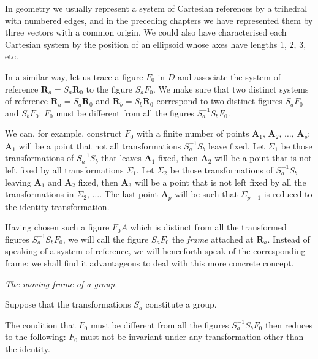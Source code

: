 \documentclass[leqno,11pt]{book}
\numberwithin{equation}{chapter}
\theoremstyle{shape1}
\theoremstyle{shapesmall}
\newcommand{\somespace}{\vspace{9pt}}
\begin{document}
In geometry we usually represent a system of Cartesian references by a trihedral with numbered edges, and in the preceding chapters we have represented them by three vectors with a common origin. We could also have characterised each Cartesian system by the position of an ellipsoid whose axes have lengths $1$, $2$, $3$, etc.

In a similar way, let us trace a figure ${F}_{0}$ in $D$ and associate the system of reference $\mathbf{R}_{a}=S_{a}\mathbf{R}_{0}$ to the figure $S_{a}F_{0}$. We make sure that two distinct systems of reference $\mathbf{R}_{a}=S_{a}\mathbf{R}_{0}$ and $\mathbf{R}_{b}=S_{b}\mathbf{R}_{0}$ correspond to two distinct figures $S_{a}F_{0}$ and $S_{b}F_{0}$: $F_{0}$ must be different from all the figures $S_{a}^{-1}S_{b}F_{0}$.

We can, for example, construct $F_{0}$ with a finite number of points $\mathbf{A}_{1}$, $\mathbf{A}_{2}$, $\dots$, $\mathbf{A}_{p}$: $\mathbf{A}_{1}$ will be a point that not all transformations $S_{a}^{-1}S_{b}$ leave fixed. Let $\Sigma_{1}$ be those transformations of $S_{a}^{-1}S_{b}$ that leaves $\mathbf{A}_{1}$ fixed, then $\mathbf{A}_{2}$ will be a point that is not left fixed by all transformations $\Sigma_{1}$. Let $\Sigma_{2}$ be those transformations of $S_{a}^{-1}S_{b}$ leaving $\mathbf{A}_{1}$ and $\mathbf{A}_{2}$ fixed, then $\mathbf{A}_{3}$ will be a point that is not left fixed by all the transformations in $\Sigma_{2}$, $\dots$. The last point $\mathbf{A}_{p}$ will be such that $\Sigma_{p+1}$ is reduced to the identity transformation.

Having chosen such a figure $F_{0}A$ which is distinct from all the transformed figures $S_{a}^{-1}S_{b}F_{0}$, we will call the figure $S_{a}F_{0}$ the \emph{frame} attached at $\mathbf{R}_{a}$. Instead of speaking of a system of reference, we will henceforth speak of the corresponding frame: we shall find it advantageous to deal with this more concrete concept.

\somespace

\emph{The moving frame of a group.}

\somespace

Suppose that the transformations $S_{a}$ constitute a group.

The condition that $F_{0}$ must be different from all the figures $S_{a}^{-1}S_{b}F_{0}$ then reduces to the following: $F_{0}$ must not be invariant under any transformation other than the identity.
\end{document}
